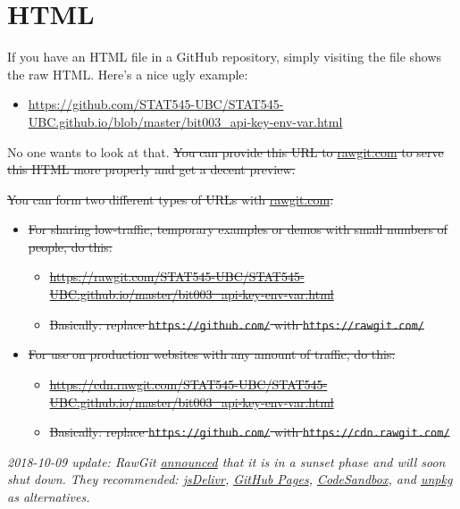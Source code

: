 \documentclass[
]{book}
\providecommand{\tightlist}{%
  \setlength{\itemsep}{0pt}\setlength{\parskip}{0pt}}
\begin{document}
\section{HTML}\label{html}

If you have an HTML file in a GitHub repository, simply visiting the file shows the raw HTML. Here's a nice ugly example:

\begin{itemize}
\tightlist
\item
  \url{https://github.com/STAT545-UBC/STAT545-UBC.github.io/blob/master/bit003_api-key-env-var.html}
\end{itemize}

No one wants to look at that. \st{You can provide this URL to \href{http://rawgit.com}{rawgit.com} to serve this HTML more properly and get a decent preview.}

\st{You can form two different types of URLs with \href{http://rawgit.com}{rawgit.com}:}

\begin{itemize}
\tightlist
\item
  \st{For sharing low-traffic, temporary examples or demos with small numbers of people, do this:}

  \begin{itemize}
  \tightlist
  \item
    \st{\url{https://rawgit.com/STAT545-UBC/STAT545-UBC.github.io/master/bit003_api-key-env-var.html}}
  \item
    \st{Basically: replace \mbox{\texttt{https://github.com/}} with \mbox{\texttt{https://rawgit.com/}}}
  \end{itemize}
\item
  \st{For use on production websites with any amount of traffic, do this:}

  \begin{itemize}
  \tightlist
  \item
    \st{\url{https://cdn.rawgit.com/STAT545-UBC/STAT545-UBC.github.io/master/bit003_api-key-env-var.html}}
  \item
    \st{Basically: replace \mbox{\texttt{https://github.com/}} with \mbox{\texttt{https://cdn.rawgit.com/}}}
  \end{itemize}
\end{itemize}

\emph{2018-10-09 update: RawGit \href{https://rawgit.com/}{announced} that it is in a sunset phase and will soon shut down. They recommended: \href{https://www.jsdelivr.com/rawgit}{jsDelivr}, \href{https://pages.github.com/}{GitHub Pages}, \href{https://codesandbox.io/}{CodeSandbox}, and \href{https://unpkg.com/\#/}{unpkg} as alternatives.}
\end{document}
